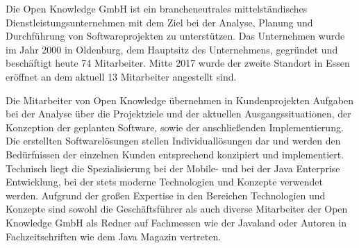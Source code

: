 Die Open Knowledge GmbH ist ein brancheneutrales mittelständisches Dienstleistungsunternehmen mit dem Ziel bei der Analyse, Planung und Durchführung von Softwareprojekten zu unterstützen. Das Unternehmen wurde im Jahr 2000 in Oldenburg, dem Hauptsitz des Unternehmens, gegründet und beschäftigt heute 74 Mitarbeiter. Mitte 2017 wurde der zweite Standort in Essen eröffnet an dem aktuell 13 Mitarbeiter angestellt sind.

Die Mitarbeiter von Open Knowledge übernehmen in Kundenprojekten Aufgaben bei der Analyse über die Projektziele und der aktuellen Ausgangssituationen, der Konzeption der geplanten Software, sowie der anschließenden Implementierung. Die erstellten Softwarelösungen stellen Individuallösungen dar und werden den Bedürfnissen der einzelnen Kunden entsprechend konzipiert und implementiert. Technisch liegt die Spezialisierung bei der Mobile- und bei der Java Enterprise Entwicklung, bei der stets moderne Technologien und Konzepte verwendet werden. Aufgrund der großen Expertise in den Bereichen Technologien und Konzepte sind sowohl die Geschäftsführer als auch diverse Mitarbeiter der Open Knowledge GmbH als Redner auf Fachmessen wie der Javaland oder Autoren in Fachzeitschriften wie dem Java Magazin vertreten.%

%

\pagebreak
